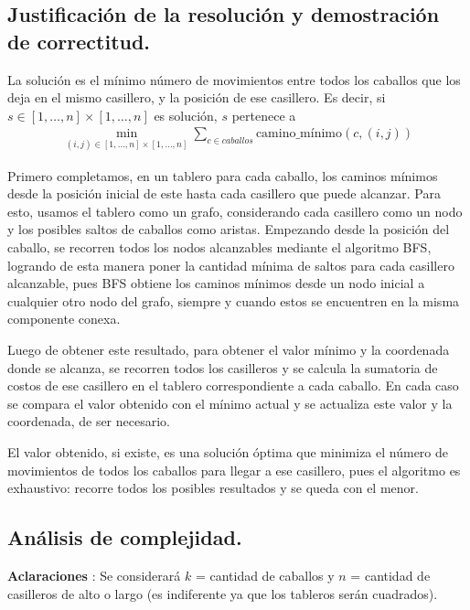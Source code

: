 \newpage
\subsection{Justificación de la resolución y demostración de correctitud.}

\vspace*{0.3cm}

La solución es el mínimo número de movimientos entre todos los caballos que
los deja en el mismo casillero, y la posición de ese casillero. Es decir, si
$s \in [1, \dots, n] \times [1, \dots, n]$ es solución, $s$ pertenece a
\begin{align*}
\min_{(i, j) \in [1, \dots, n] \times [1, \dots, n]} \sum_{c \in caballos}
\text{camino\_mínimo}(c, (i, j))
\end{align*}

Primero completamos, en un tablero para cada caballo, los caminos mínimos
desde la posición inicial de este hasta cada casillero que puede alcanzar.
Para esto, usamos el tablero como un grafo, considerando cada casillero como
un nodo y los posibles saltos de caballos como aristas. Empezando desde la
posición del caballo, se recorren todos los nodos alcanzables mediante el
algoritmo BFS, logrando de esta manera poner la cantidad mínima de saltos
para cada casillero alcanzable, pues BFS obtiene los caminos mínimos desde
un nodo inicial a cualquier otro nodo del grafo, siempre y cuando estos se
encuentren en la misma componente conexa.

Luego de obtener este resultado, para obtener el valor mínimo y la
coordenada donde se alcanza, se recorren todos los casilleros y se calcula
la sumatoria de costos de ese casillero en el tablero correspondiente a cada
caballo. En cada caso se compara el valor obtenido con el mínimo actual y se
actualiza este valor y la coordenada, de ser necesario.

El valor obtenido, si existe, es una solución óptima que minimiza el número
de movimientos de todos los caballos para llegar a ese casillero, pues el
algoritmo es exhaustivo: recorre todos los posibles resultados y se queda
con el menor.

\newpage
\subsection{Análisis de complejidad.}

\vspace*{0.3cm}

\textbf{Aclaraciones} : Se considerará $k$ = cantidad de caballos
 y $n$ = cantidad de casilleros de alto o largo (es indiferente ya que los
 tableros serán cuadrados).

